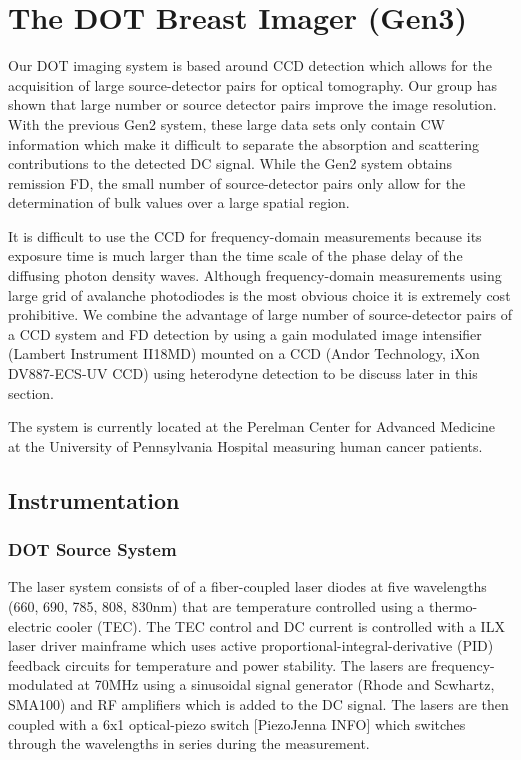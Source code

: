 \section{The DOT Breast Imager (Gen3)}
Our DOT imaging system is based around CCD detection which allows for the acquisition of large source-detector pairs for optical tomography. Our group has shown that large number or source detector pairs improve the image resolution. With the previous Gen2 system, these large data sets only contain CW information which make it difficult to separate the absorption and scattering contributions to the detected DC signal. While the Gen2 system obtains remission FD, the small number of source-detector pairs only allow for the determination of bulk values over a large spatial region.

It is difficult to use the CCD for frequency-domain measurements because its exposure time is much larger than the time scale of the phase delay of the diffusing photon density waves. Although frequency-domain measurements using large grid of avalanche photodiodes is the most obvious choice it is extremely cost prohibitive. We combine the advantage of large number of source-detector pairs of a CCD system and FD detection by using a gain modulated image intensifier (Lambert Instrument II18MD) mounted on a CCD (Andor Technology, iXon DV887-ECS-UV CCD) using heterodyne detection to be discuss later in this section.

The system is currently located at the Perelman Center for Advanced Medicine at the University of Pennsylvania Hospital measuring human cancer patients.

\subsection{Instrumentation}
\subsubsection{DOT Source System}
The laser system consists of of a fiber-coupled laser diodes at five wavelengths (660, 690, 785, 808, 830nm) that are temperature controlled using a thermo-electric cooler (TEC). The TEC control and DC current is controlled with a ILX laser driver mainframe which uses active proportional-integral-derivative (PID) feedback circuits for temperature and power stability. The lasers are frequency-modulated at 70MHz using a sinusoidal signal generator (Rhode and Scwhartz, SMA100) and RF amplifiers which is added to the DC signal. The lasers are then coupled with a 6x1 optical-piezo switch [PiezoJenna INFO] which switches through the wavelengths in series during the measurement. 

